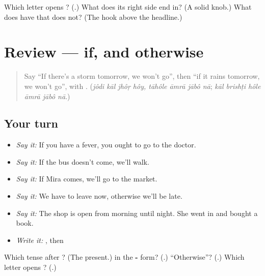 \begin{tcolorbox}[breakable,colback=teal!4,colframe=teal!35!black,title={Before you move on}]
Which letter opens \textbf{}? (\textbf{}.) What does its right side end in? (A solid knob.) What does \textbf{} have that \textbf{} does not? (The hook above the headline.)
\end{tcolorbox}
\section[(review)]{Review — if, and otherwise}

\label{lesson:BN-R274-if-and-otherwise}



\begin{quote}
Say \textquotedblleft{}If there's a storm tomorrow, we won't go\textquotedblright{}, then \textquotedblleft{}if it rains tomorrow, we won't go\textquotedblright{}, with \textbf{}. (\emph{jôdi kāl jhôṛ hôy, tāhôle āmrā jābô nā}; \emph{kāl brishṭi hôle āmrā jābô nā}.)
\end{quote}

\subsection*{Your turn}
\begin{itemize}
\raggedright
  \item \emph{Say it:} If you have a fever, you ought to go to the doctor.
  \item \emph{Say it:} If the bus doesn't come, we'll walk.
  \item \emph{Say it:} If Mira comes, we'll go to the market.
  \item \emph{Say it:} We have to leave now, otherwise we'll be late.
  \item \emph{Say it:} The shop is open from morning until night. She went in and bought a book.
  \item \emph{Write it:} \textbf{}, then \textbf{}
\end{itemize}

\begin{tcolorbox}[breakable,colback=teal!4,colframe=teal!35!black,title={Before you move on}]
Which tense after \textbf{}? (The present.) \textbf{} in the \textbf{-} form? (\textbf{}.) \textquotedblleft{}Otherwise\textquotedblright{}? (\textbf{}.) Which letter opens \textbf{}? (\textbf{}.)
\end{tcolorbox}

